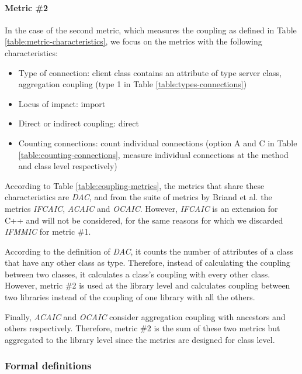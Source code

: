 \paragraph{Metric \#2}
In the case of the second metric, which measures the coupling as defined in Table \ref{table:metric-characteristics}, we focus on the metrics with the following characteristics:

\begin{itemize}
  \item Type of connection: client class contains an attribute of type server class, aggregation coupling (type 1 in Table \ref{table:types-connections})
  \item Locus of impact: import
  \item Direct or indirect coupling: direct
  \item Counting connections: count individual connections (option A and C in Table \ref{table:counting-connections}, measure individual connections at the method and class level respectively)
\end{itemize}

According to Table \ref{table:coupling-metrics}, the metrics that share these characteristics are \textit{DAC}, and from the suite of metrics by Briand et al. \cite{briand1997investigation} the metrics \textit{IFCAIC}, \textit{ACAIC} and \textit{OCAIC}. However, \textit{IFCAIC} is an extension for C++ and will not be considered, for the same reasons for which we discarded \textit{IFMMIC} for metric \#1.

According to the definition of \textit{DAC}, it counts the number of attributes of a class that have any other class as type. Therefore, instead of calculating the coupling between two classes, it calculates a class's coupling with every other class. However, metric \#2 is used at the library level and calculates coupling between two libraries instead of the coupling of one library with all the others.

Finally, \textit{ACAIC} and \textit{OCAIC} consider aggregation coupling with ancestors and others respectively. Therefore, metric  \#2 is the sum of these two metrics but aggregated to the library level since the metrics are designed for class level.

\subsubsection{Formal definitions}\label{subsec:metric-definition}

